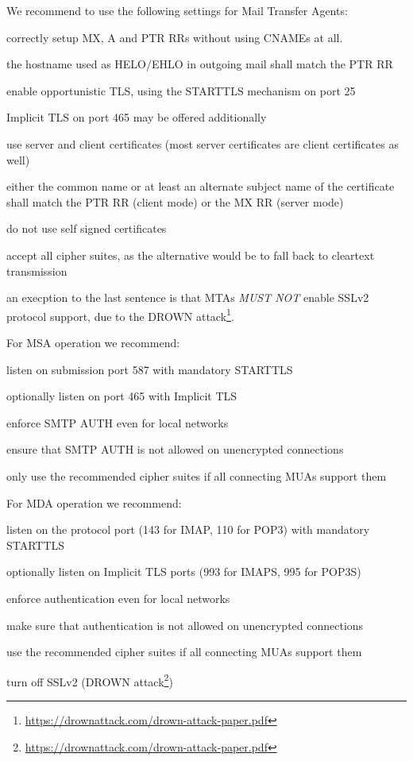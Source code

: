 We recommend to use the following settings for Mail Transfer Agents:
\begin{itemize*}
  \item correctly setup MX, A and PTR RRs without using CNAMEs at all.
  \item the hostname used as HELO/EHLO in outgoing mail shall match the PTR RR
  \item enable opportunistic TLS, using the STARTTLS mechanism on port 25
  \item Implicit TLS on port 465 may be offered additionally
  \item use server and client certificates (most server certificates are client
    certificates as well)
  \item either the common name or at least an alternate subject name of the
    certificate shall match the PTR RR (client mode) or the MX RR (server mode)
  \item do not use self signed certificates
  \item accept all cipher suites, as the alternative would be to fall back to
    cleartext transmission
  \item an execption to the last sentence is that MTAs \textit{MUST NOT} 
    enable SSLv2 protocol support, due to the DROWN attack\footnote{\url{https://drownattack.com/drown-attack-paper.pdf}}.
\end{itemize*}

For MSA operation we recommend:
\begin{itemize*}
  \item listen on submission port 587 with mandatory STARTTLS
  \item optionally listen on port 465 with Implicit TLS
  \item enforce SMTP AUTH even for local networks
  \item ensure that SMTP AUTH is not allowed on unencrypted connections
  \item only use the recommended cipher suites if all connecting MUAs support them
\end{itemize*}

For MDA operation we recommend:
\begin{itemize*}
  \item listen on the protocol port (143 for IMAP, 110 for POP3) with mandatory
    STARTTLS
  \item optionally listen on Implicit TLS ports (993 for IMAPS, 995 for POP3S)
  \item enforce authentication even for local networks
  \item make sure that authentication is not allowed on unencrypted connections
  \item use the recommended cipher suites if all connecting MUAs support them
  \item turn off SSLv2 (DROWN attack\footnote{\url{https://drownattack.com/drown-attack-paper.pdf}})
\end{itemize*}

